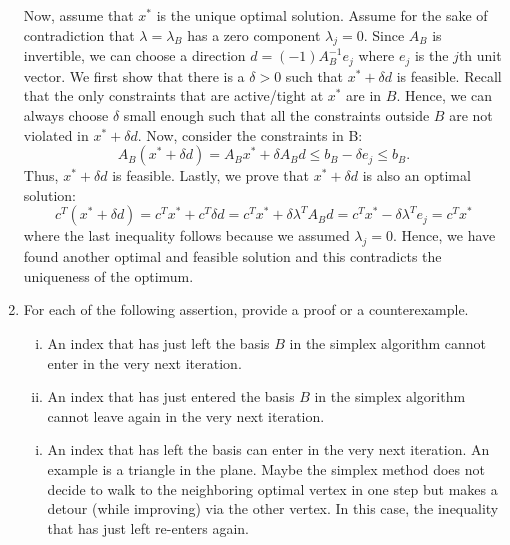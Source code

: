 \documentclass[11pt]{article}
\begin{document}
\begin{enumerate}[1)]
\begin{solution}
Now, assume that $x^\ast$ is the unique optimal solution. Assume for the sake of contradiction that $λ= λ_B$ has a zero component $λ_j = 0$. Since $A_B$ is invertible, we can choose a direction $d= (−1)A^{−1}_B e_j$ where $e_j$ is the $j$th unit vector. We first show that there is a $δ >0$ such that $x^
\ast+ δd$ is feasible. Recall that the only constraints that are active/tight
at $x^\ast$ are in $B$. Hence, we can always choose $δ$ small enough such that all the constraints outside
$B$ are not violated in $x^\ast+ δd$. Now, consider the constraints in B:
$$A_B (x^\ast+ δd) = A_B x^\ast+ δA_B d ≤b_B−δe_j ≤b_B.$$
Thus, $x^\ast+ δd$ is feasible.
Lastly, we prove that $x^\ast+ δd$ is also an optimal solution:
$$c^T (x^\ast+ δd) = c^T x^\ast+ c^T δd= c^T x^\ast+ δλ^T A_B d= c^T x^\ast−δλ^T e_j= c^T x^\ast$$
where the last inequality follows because we assumed $λ_j = 0$. Hence, we have found another optimal
and feasible solution and this contradicts the uniqueness of the optimum.


\end{solution}


\item For each of the following assertion, provide a proof or a counterexample. 
  \begin{enumerate}[i)]
  \item An index that has just left the basis $B$ in the simplex
    algorithm cannot enter in the very next iteration.
  \item An index that has just entered the basis $B$ in the simplex
    algorithm cannot leave again in the very next iteration. 
  \end{enumerate}
  
  
  
  \begin{solution}
   \begin{enumerate}[i)]
  \item An index that has left the basis can enter in the very next iteration. An example is a triangle
in the plane. Maybe the simplex method does not decide to walk to the neighboring optimal
vertex in one step but makes a detour (while improving) via the other vertex. In this case, the
inequality that has just left re-enters again.
  
  
  

\end{enumerate}
\end{solution}
\end{enumerate}
\end{document}
